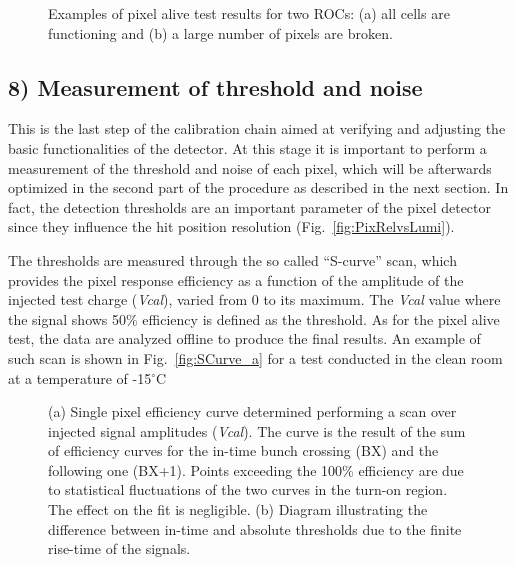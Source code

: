 \begin{figure}[!htb]
 \begin{center}
 \end{center}
 \caption{Examples of pixel alive test results for two ROCs: (a) all cells are functioning and (b) a large number of pixels are broken.}
 \label{fig:PixelAlive}
\end{figure}

\subsection*{8) Measurement of threshold and noise}

This is the last step of the calibration chain aimed at verifying and adjusting the basic functionalities of the detector.
At this stage it is important to perform a measurement of the threshold and noise of each pixel, which will be afterwards optimized in the second part of the procedure as described in the next section.
In fact, the detection thresholds are an important parameter of the pixel detector since they influence the hit position resolution (Fig.~\ref{fig:PixRelvsLumi}).

The thresholds are measured through the so called ``S-curve'' scan, which provides the pixel response efficiency as a function of the amplitude of the injected test charge (\textit{Vcal}), varied from 0 to its maximum.
The \textit{Vcal} value where the signal shows 50\% efficiency is defined as the threshold.
As for the pixel alive test, the data are analyzed offline to produce the final results.
An example of such scan is shown in Fig.~\ref{fig:SCurve_a} for a test conducted in the clean room at a temperature of -15\unit{$^\circ$C}.\\

\begin{figure}[!t]
 \begin{center}
 \end{center}
 \caption{(a) Single pixel efficiency curve determined performing a scan over injected signal amplitudes (\textit{Vcal}). The curve is the result of the sum of efficiency curves for the in-time bunch crossing (BX) and the following one (BX+1). Points exceeding the 100\% efficiency are due to statistical fluctuations of the two curves in the turn-on region. The effect on the fit is negligible. (b) Diagram illustrating the difference between in-time and absolute thresholds due to the finite rise-time of the signals.}
 \label{fig:SCurve}
\end{figure}

